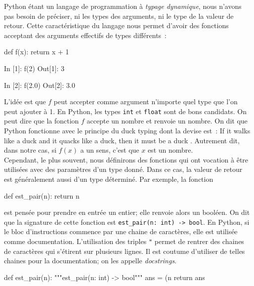 \documentclass{magnoliaold}
\begin{document}
Python étant un langage de programmation à \emph{typage dynamique}, nous n'avons pas besoin de
préciser, ni les types des arguments, ni le type de la valeur de retour. Cette caractéristique
du langage nous permet d'avoir des fonctions acceptant des arguments effectifs de types différents~:

\begin{pythoncodeline}
def f(x):
    return x + 1
\end{pythoncodeline}

\begin{pythoncode}
In [1]: f(2)
Out[1]: 3

In [2]: f(2.0)
Out[2]: 3.0
\end{pythoncode}

\noindent
L'idée est que $f$ peut accepter comme argument n'importe quel type que l'on peut
ajouter à 1. En Python, les types \verb_int_ et \verb_float_ sont de bons
candidats. On peut dire que la fonction $f$ accepte un nombre et renvoie un nombre.
On dit que Python fonctionne avec le principe du \og duck typing \fg dont la devise est~:
\og If it walks like a duck and it quacks like a duck, then it must be a duck \fg. Autrement
dit, dans notre cas, si $f(x)$ a un sens, c'est que $x$ est un nombre.\\

Cependant, le plus souvent, nous définirons des fonctions qui ont vocation
à être utilisées avec des paramètres d'un type donné. Dans ce cas, la valeur
de retour est généralement aussi d'un type déterminé. Par exemple, la fonction

\begin{pythoncodeline}
def est_pair(n):
    return n %
\end{pythoncodeline}

\noindent
est pensée pour prendre en entrée un entier; elle renvoie alors un booléen. On dit que la signature
de cette fonction est \verb!est_pair(n: int) -> bool!. En Python, si le bloc
d'instructions commence par une chaine de caractères, elle est utilisée comme
documentation. L'utilisation des triples \verb_"_ permet 
de rentrer des chaines de caractères qui  s'étirent sur plusieurs lignes.
Il est coutume d'utiliser de telles chaines pour la documentation; on les appelle
\emph{docstrings}.

\begin{pythoncodeline}
def est_pair(n):
    """est_pair(n: int) -> bool"""
    ans = (n %
    return ans
\end{pythoncodeline}
\end{document}
